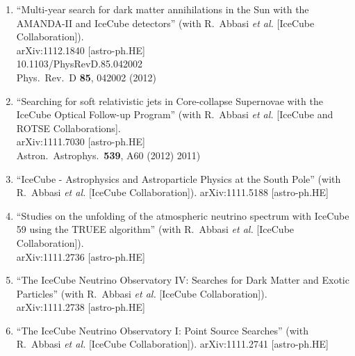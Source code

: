 \begin{enumerate}


\item ``Multi-year search for dark matter annihilations in the Sun with the
  AMANDA-II and IceCube detectors'' (with R.~Abbasi {\it et al.}
  [IceCube Collaboration]).  \\{}arXiv:1112.1840 [astro-ph.HE]
  \\{}10.1103/PhysRevD.85.042002 \\{}Phys.\ Rev.\ D {\bf 85}, 042002
  (2012) %


\item ``Searching for soft relativistic jets in Core-collapse Supernovae
  with the IceCube Optical Follow-up Program'' (with R.~Abbasi {\it et
    al.}  [IceCube and ROTSE Collaborations].  \\{}arXiv:1111.7030
  [astro-ph.HE] \\{}Astron.\ Astrophys.\ {\bf 539}, A60 (2012) %
  2011)


\item ``IceCube - Astrophysics and Astroparticle Physics at the South Pole'' (with R.~Abbasi {\it et al.}  [IceCube Collaboration]). arXiv:1111.5188 [astro-ph.HE]
  


\item ``Studies on the unfolding of the atmospheric neutrino spectrum with
  IceCube 59 using the TRUEE algorithm'' (with R.~Abbasi {\it et al.}
  [IceCube Collaboration]).  \\{}arXiv:1111.2736 [astro-ph.HE]
  


\item ``The IceCube Neutrino Observatory IV: Searches for Dark Matter and
  Exotic Particles'' (with R.~Abbasi {\it et al.}  [IceCube
    Collaboration]).  \\{}arXiv:1111.2738 [astro-ph.HE]
  


\item ``The IceCube Neutrino Observatory I: Point Source Searches'' (with R.~Abbasi {\it et al.}  [IceCube Collaboration]). arXiv:1111.2741 [astro-ph.HE]
  

\end{enumerate}
